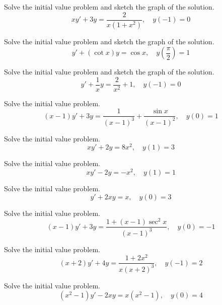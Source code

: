 \documentclass{ximera}
\begin{document}
\begin{problem}\label{exer:2.1.27} Solve the
initial value problem and sketch the graph of the solution.
$$xy'+3y=\frac{2}{x(1+x^2)},\quad y(-1)=0$$
\end{problem}

\begin{problem}\label{exer:2.1.28} Solve the
initial value problem and sketch the graph of the solution.
$$y'+ (\cot x)y=\cos x,\quad
y\left(\frac{\pi}{2}\right)=1$$
\end{problem}

\begin{problem}\label{exer:2.1.29} Solve the
initial value problem and sketch the graph of the solution.
$$y'+\frac{1}{x}y=\frac{2}{x^2}+1,\quad y(-1)=0$$
\end{problem}

\begin{problem}\label{exer:2.1.30} Solve the initial value problem.
$$(x-1)y'+3y=\frac{1}{(x-1)^3} +
\frac{\sin x}{(x-1)^2},\quad y(0)=1$$
\end{problem}

\begin{problem}\label{exer:2.1.31} Solve the initial value problem.
$$xy'+2y=8x^2,\quad y(1)=3$$
\end{problem}

\begin{problem}\label{exer:2.1.32} Solve the initial value problem.
$$xy'-2y=-x^2,\quad y(1)=1$$
\end{problem}

\begin{problem}\label{exer:2.1.33} Solve the initial value problem.
$$y'+2xy=x,\quad y(0)=3$$
\end{problem}

\begin{problem}\label{exer:2.1.34} Solve the initial value problem.
$$(x-1)y'+3y=\frac{1+(x-1)\sec^2x}{(x-1)^3},\quad y(0)=-1$$
\end{problem}

\begin{problem}\label{exer:2.1.35} Solve the initial value problem.
$$(x+2)y'+4y=\frac{1+2x^2}{x(x+2)^3},\quad y(-1)=2$$
\end{problem}

\begin{problem}\label{exer:2.1.36} Solve the initial value problem.
$$(x^2-1)y'-2xy=x(x^2-1),\quad y(0)=4$$
\end{problem}
\end{document}
